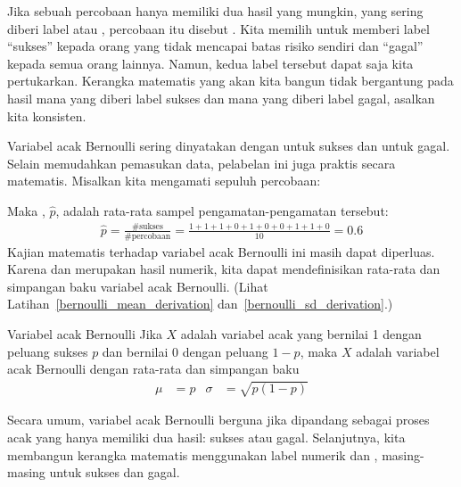 Jika sebuah percobaan hanya memiliki dua hasil yang mungkin, yang sering
diberi label  atau , percobaan itu disebut
.
Kita memilih untuk memberi label ``sukses'' kepada orang yang tidak
mencapai batas risiko sendiri dan ``gagal'' kepada semua orang lainnya.
Namun, kedua label tersebut dapat saja kita pertukarkan. Kerangka
matematis yang akan kita bangun tidak bergantung pada hasil mana yang
diberi label sukses dan mana yang diberi label gagal, asalkan kita
konsisten.

Variabel acak Bernoulli sering dinyatakan dengan  untuk sukses
dan  untuk gagal. Selain memudahkan pemasukan data, pelabelan ini
juga praktis secara matematis. Misalkan kita mengamati sepuluh percobaan:
\begin{center}
         
\end{center}
Maka , $\hat{p}$, adalah
rata-rata sampel pengamatan-pengamatan tersebut:
\begin{align*}
\hat{p} = \frac{\text{\# sukses}}{\text{\# percobaan}}
    = \frac{1+1+1+0+1+0+0+1+1+0}{10} = 0.6
\end{align*}%
Kajian matematis terhadap variabel acak Bernoulli ini masih dapat
diperluas.
Karena  dan  merupakan hasil numerik, kita dapat
mendefinisikan {rata-rata} dan {simpangan baku} variabel acak Bernoulli.
(Lihat Latihan~\ref{bernoulli_mean_derivation}
dan~\ref{bernoulli_sd_derivation}.)

\begin{onebox}{Variabel acak Bernoulli}
  Jika $X$ adalah variabel acak yang bernilai 1 dengan
  peluang sukses $p$ dan bernilai 0 dengan peluang $1-p$,
  maka $X$ adalah variabel acak Bernoulli dengan rata-rata
  dan simpangan baku
  \begin{align*}
  \mu &= p
      &\sigma&= \sqrt{p(1-p)}
  \end{align*}
\end{onebox}

Secara umum, variabel acak Bernoulli berguna jika dipandang sebagai proses
acak yang hanya memiliki dua hasil: sukses atau gagal. Selanjutnya, kita
membangun kerangka matematis menggunakan label numerik  dan
, masing-masing untuk sukses dan gagal.

